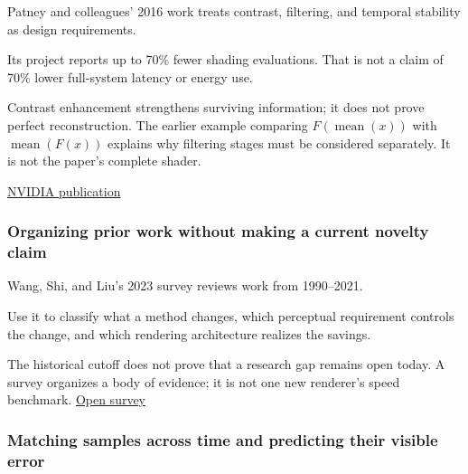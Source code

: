 \hypertarget{04-visual-computing-ii-ch042-keeping-resolvable-contrast-rather-than-merely-blurring-the-periphery}{}

Patney and colleagues' 2016 work treats contrast, filtering, and temporal stability as design requirements.

Its project reports up to 70\% fewer shading evaluations. That is not a claim of 70\% lower full-system latency or energy use.

Contrast enhancement strengthens surviving information; it does not prove perfect reconstruction. The earlier example comparing \(F(\operatorname{mean}(x))\) with \(\operatorname{mean}(F(x))\) explains why filtering stages must be considered separately. It is not the paper's complete shader.

\href{https://research.nvidia.com/publication/2016-12_towards-foveated-rendering-gaze-tracked-virtual-reality}{NVIDIA publication}

\subsubsection{Organizing prior work without making a current novelty claim}\label{04-visual-computing-ii-ch042-organizing-prior-work-without-making-a-current-novelty-claim}

\hypertarget{04-visual-computing-ii-ch042-organizing-prior-work-without-making-a-current-novelty-claim}{}

Wang, Shi, and Liu's 2023 survey reviews work from 1990--2021.

Use it to classify what a method changes, which perceptual requirement controls the change, and which rendering architecture realizes the savings.

The historical cutoff does not prove that a research gap remains open today. A survey organizes a body of evidence; it is not one new renderer's speed benchmark. \href{https://link.springer.com/article/10.1007/s41095-022-0306-4}{Open survey}

\subsubsection{Matching samples across time and predicting their visible error}\label{04-visual-computing-ii-ch042-matching-samples-across-time-and-predicting-their-visible-error}

\hypertarget{04-visual-computing-ii-ch042-matching-samples-across-time-and-predicting-their-visible-error}{}

